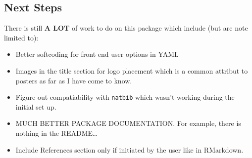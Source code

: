 \documentclass[article,30pt,extrafontsizes]{memoir}
\begin{document}
\begin{adjmulticols*}{4}{10mm}{10mm}
{\lipsum[1-5]

\section{Next Steps}\label{next-steps}

There is still \textbf{A LOT} of work to do on this package which
include (but are note limited to):

\begin{itemize}
\tightlist
\item
  Better softcoding for front end user options in YAML
\item
  Images in the title section for logo placement which is a common
  attribut to posters as far as I have come to know.
\item
  Figure out compatiability with \texttt{natbib} which wasn't working
  during the initial set up.
\item
  MUCH BETTER PACKAGE DOCUMENTATION. For example, there is nothing in
  the README\ldots{}
\item
  Include References section only if initiated by the user like in
  RMarkdown.
\end{itemize}

\small\printbibliography
}
\end{adjmulticols*}
\end{document}
